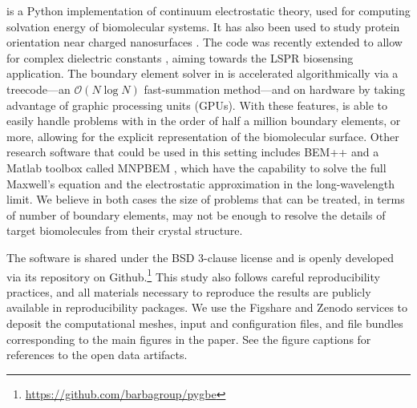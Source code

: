 \pygbe is a Python implementation of continuum electrostatic theory, used
for computing solvation energy of biomolecular systems. 
It has also been used to study protein orientation near charged nanosurfaces \cite{CooperClementiBarba2015}.
The code was recently extended to allow for complex dielectric constants 
\cite{ClementiETal2017}, aiming towards the LSPR biosensing application. 
The boundary element solver in \pygbe
is accelerated algorithmically via a treecode---an $\mathcal{O}(N\log N)$ fast-summation method---and on hardware by taking advantage of graphic processing units (GPUs). 
With these features, \pygbe is able to easily handle problems with in the order of 
half a million boundary elements, or more, 
allowing for the explicit representation of the biomolecular surface.
Other research software that could be used in this setting includes  
BEM++ \cite{SmigajETal2015} and a Matlab toolbox called MNPBEM \cite{HohenesterTrugler2012}, which have the capability to solve the full Maxwell's equation and the electrostatic approximation in the long-wavelength limit.
We believe in both cases the size of problems that can be treated, in terms of number of boundary elements, may not be enough to resolve the details of target biomolecules from their crystal structure. 

The software is shared under the BSD 3-clause license 
and is openly developed via its repository on Github.\footnote{\url{https://github.com/barbagroup/pygbe}}
This study also follows careful reproducibility practices, and all materials necessary
to reproduce the results are publicly available in reproducibility packages.
We use the Figshare and Zenodo services to deposit the computational meshes,
input and configuration files, and file bundles corresponding to the main figures in the paper.
See the figure captions for references to the open data artifacts.



